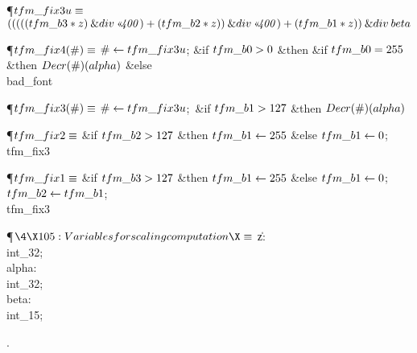 \Y\P\D {}$\\{tfm\_fix3u}\S$\6
$(((((\\{tfm\_b3}\ast\|z)\mathbin{\&{div}}\O{400})+(\\{tfm\_b2}\ast\|z))%
\mathbin{\&{div}}\O{400})+(\\{tfm\_b1}\ast\|z))\mathbin{\&{div}}\\{beta}$\Y\par
\P\D {}$\\{tfm\_fix4}(\#)\S$\6
$\#\K\\{tfm\_fix3u}$;\6
\&{if} $\\{tfm\_b0}>0$ \1\&{then}\6
\&{if} $\\{tfm\_b0}=255$ \1\&{then}\5
$\\{Decr}(\#)(\\{alpha})$\6
\4\&{else} \\{bad\_font}\2\2\par
\P\D {}$\\{tfm\_fix3}(\#)\S$\6
$\#\K\\{tfm\_fix3u}$;\ \&{if} $\\{tfm\_b1}>127$ \1\&{then}\5
$\\{Decr}(\#)(\\{alpha})$\2\par
\P\D {}$\\{tfm\_fix2}\S$\6
\&{if} $\\{tfm\_b2}>127$ \1\&{then}\5
$\\{tfm\_b1}\K255$\6
\4\&{else} $\\{tfm\_b1}\K0$;\2\6
\\{tfm\_fix3}\par
\P\D {}$\\{tfm\_fix1}\S$\6
\&{if} $\\{tfm\_b3}>127$ \1\&{then}\5
$\\{tfm\_b1}\K255$\6
\4\&{else} $\\{tfm\_b1}\K0$;\2\6
$\\{tfm\_b2}\K\\{tfm\_b1}$;\5
\\{tfm\_fix3}\par
\Y\P$\4\X105:Variables for scaling computation\X\S$\6
\4\|z: \\{int\_32};\6
\4\\{alpha}: \\{int\_32};\6
\4\\{beta}: \\{int\_15};\par
{}.\fi

